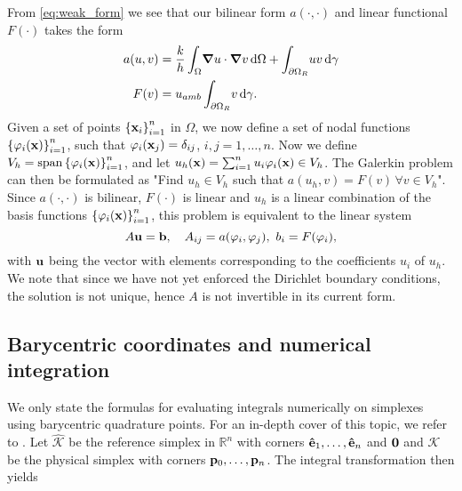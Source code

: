 From \eqref{eq:weak_form} we see that our bilinear form $a(\cdot,\cdot)$ and linear functional $F(\cdot)$ takes the form
\begin{align}
	a(u,v) &= \frac{k}{h}\int_\Omega \! \grad{u}\cdot\grad{v} \, \mathrm{d}\Omega + \int_{\partial\Omega_R} \! uv\, \mathrm{d}\gamma \\
	F(v) &= u_{amb}\int_{\partial\Omega_R} \! v \, \mathrm{d}\gamma.
	\label{eq:bilin_form}
\end{align}
Given a set of points $\left\{\vb{x}_i\right\}_{i=1}^n$ in $\Omega$, we now define a set of nodal functions $\left\{\varphi_i(\vb{x})\right\}_{i=1}^n$, such that $\varphi_i(\vb{x}_j) = \delta_{ij}$, $i,j = 1,\dots,n$. Now we define $V_h = \operatorname{span}\left\{\varphi_i(\vb{x})\right\}_{i=1}^n$, and let $u_h(\vb{x}) = \sum_{i=1}^{n} u_i \varphi_i(\vb{x}) \in V_h$. The Galerkin problem can then be formulated as "Find $u_h \in V_h$ such that $a(u_h,v) = F(v)\, \forall v \in V_h$". Since $a(\cdot,\cdot)$ is bilinear, $F(\cdot)$ is linear and $u_h$  is a linear combination of the basis functions $\left\{\varphi_i(\vb{x})\right\}_{i=1}^n$, this problem is equivalent to the linear system %
\begin{equation}
	A\vb{u} = \vb{b}, \quad A_{ij} = a(\varphi_i,\varphi_j), \,\, b_i = F(\varphi_i)
	\label{eq:lin_sys},
\end{equation}
with $\vb{u}$ being the vector with elements corresponding to the coefficients $u_i$ of $u_h$. We note that since we have not yet enforced the Dirichlet boundary conditions, the solution is not unique, hence $A$ is not invertible in its current form.

\subsection{Barycentric coordinates and numerical integration}
We only state the formulas for evaluating integrals numerically on simplexes using barycentric quadrature points. For an in-depth cover of this topic, we refer to \cite{quarteroni}. Let $\mathcal{\hat{K}}$ be the reference simplex in $\mathbb{R}^n$ with corners $\vb{\hat{e}}_1,\dots,\vb{\hat{e}}_n$ and $\vb{0}$ and  $\mathcal{K}$ be the physical simplex with corners $\vb{p}_0,\dots,\vb{p}_n$. The integral transformation then yields 

